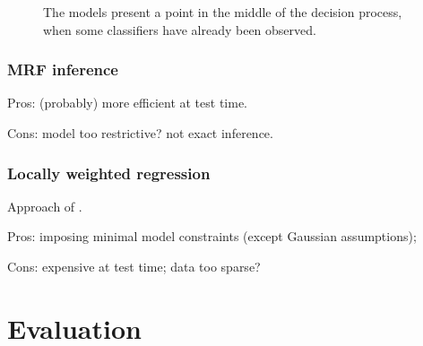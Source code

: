 \documentclass[runningheads]{llncs}
\begin{document}
\begin{figure}[h!]
\centering
{} \hfill
{}
\caption{The models present a point in the middle of the decision process, when some classifiers have already been observed.}
\label{fig:models}
\end{figure}

\subsubsection{MRF inference}
Pros: (probably) more efficient at test time.

Cons: model too restrictive? not exact inference.

\subsubsection{Locally weighted regression}
Approach of \cite{Gao2011}.

Pros: imposing minimal model constraints (except Gaussian assumptions); 

Cons: expensive at test time; data too sparse?

\section{Evaluation} \label{sec:evaluation}



\end{document}
